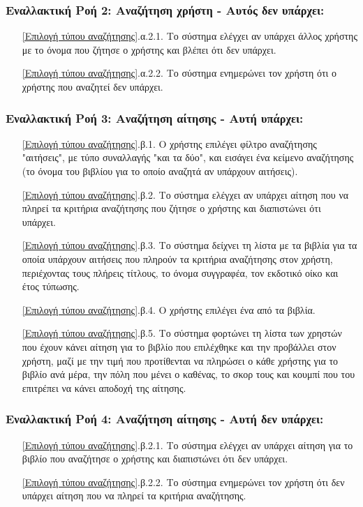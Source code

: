 \documentclass[12pt,a4paper]{article}
\begin{document}
\subsubsection*{Εναλλακτική Ροή 2: Αναζήτηση χρήστη - Αυτός δεν υπάρχει:}
\begin{enumerate}
    \item[\ref{Επιλογή τύπου αναζήτησης}.α.2.1.] Το σύστημα ελέγχει αν υπάρχει άλλος χρήστης με το όνομα που ζήτησε ο χρήστης και βλέπει ότι δεν υπάρχει.
    \item[\ref{Επιλογή τύπου αναζήτησης}.α.2.2.] Το σύστημα ενημερώνει τον χρήστη ότι ο χρήστης που αναζητεί δεν υπάρχει.
\end{enumerate}

\subsubsection*{Εναλλακτική Ροή 3: Αναζήτηση αίτησης - Αυτή υπάρχει:}
\begin{enumerate}
    \item[\ref{Επιλογή τύπου αναζήτησης}.β.1.] Ο χρήστης επιλέγει φίλτρο αναζήτησης "αιτήσεις", με τύπο συναλλαγής "και τα δύο", και εισάγει ένα κείμενο αναζήτησης (το όνομα του βιβλίου για το οποίο αναζητά αν υπάρχουν αιτήσεις).
    \item[\ref{Επιλογή τύπου αναζήτησης}.β.2.] Το σύστημα ελέγχει αν υπάρχει αίτηση που να πληρεί τα κριτήρια αναζήτησης που ζήτησε ο χρήστης και διαπιστώνει ότι υπάρχει.
    \item[\ref{Επιλογή τύπου αναζήτησης}.β.3.] Το σύστημα δείχνει τη λίστα με τα βιβλία για τα οποία υπάρχουν αιτήσεις που πληρούν τα κριτήρια αναζήτησης στον χρήστη, περιέχοντας τους πλήρεις τίτλους, το όνομα συγγραφέα, τον εκδοτικό οίκο και έτος τύπωσης.
    \item[\ref{Επιλογή τύπου αναζήτησης}.β.4.] Ο χρήστης επιλέγει ένα από τα βιβλία.
    \item[\ref{Επιλογή τύπου αναζήτησης}.β.5.] Το σύστημα φορτώνει τη λίστα των χρηστών που έχουν κάνει αίτηση για το βιβλίο που επιλέχθηκε και την προβάλλει στον χρήστη, μαζί με την τιμή που προτίθενται να πληρώσει ο κάθε χρήστης για το βιβλίο ανά μέρα, την πόλη που μένει ο καθένας, το σκορ τους και κουμπί που του επιτρέπει να κάνει αποδοχή της αίτησης.
\end{enumerate}

\subsubsection*{Εναλλακτική Ροή 4: Αναζήτηση αίτησης - Αυτή δεν υπάρχει:}
\begin{enumerate}
    \item[\ref{Επιλογή τύπου αναζήτησης}.β.2.1.] Το σύστημα ελέγχει αν υπάρχει αίτηση για το βιβλίο που αναζήτησε ο χρήστης και διαπιστώνει ότι δεν υπάρχει.
    \item[\ref{Επιλογή τύπου αναζήτησης}.β.2.2.] Το σύστημα ενημερώνει τον χρήστη ότι δεν υπάρχει αίτηση που να πληρεί τα κριτήρια αναζήτησης.
\end{enumerate}
\end{document}
